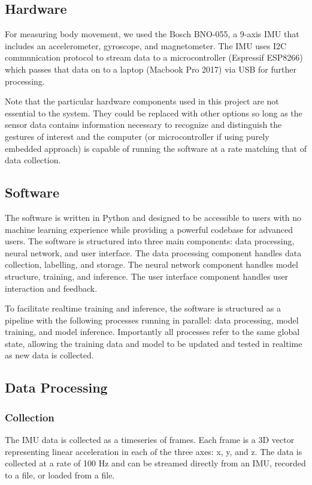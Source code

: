 \documentclass{article}
\begin{document}
\subsection{Hardware}
For measuring body movement, we used the Bosch BNO-055, a 9-axis IMU that includes an accelerometer, gyroscope, and magnetometer. The IMU uses I2C communication protocol to stream data to a microcontroller (Espressif ESP8266) which passes that data on to a laptop  (Macbook Pro 2017) via USB for further processing.

Note that the particular hardware components used in this project are not essential to the system. They could be replaced with other options so long as the sensor data contains information necessary to recognize and distinguish the gestures of interest and the computer (or microcontroller if using purely embedded approach) is capable of running the software at a rate matching that of data collection.

\subsection{Software}
The software is written in Python and designed to be accessible to users with no machine learning experience while providing a powerful codebase for advanced users. The software is structured into three main components: data processing, neural network, and user interface. The data processing component handles data collection, labelling, and storage. The neural network component handles model structure, training, and inference. The user interface component handles user interaction and feedback.

To facilitate realtime training and inference, the software is structured as a pipeline with the following processes running in parallel: data processing, model training, and model inference. Importantly all processes refer to the same global state, allowing the training data and model to be updated and tested in realtime as new data is collected.

\subsection{Data Processing}
\subsubsection{Collection}
The IMU data is collected as a timeseries of frames. Each frame is a 3D vector representing linear acceleration in each of the three axes: x, y, and z. The data is collected at a rate of 100 Hz and can be streamed directly from an IMU, recorded to a file, or loaded from a file.
\end{document}
